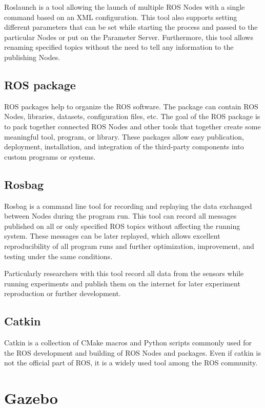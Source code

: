 Roslaunch is a tool allowing the launch of multiple ROS Nodes with a single command based on an XML configuration. This tool also supports setting different parameters that can be set while starting the process and passed to the particular Nodes or put on the Parameter Server. Furthermore, this tool allows renaming specified topics without the need to tell any information to the publishing Nodes.

\subsection*{ROS package}

ROS packages help to organize the ROS software. The package can contain ROS Nodes, libraries, datasets, configuration files, etc. The goal of the ROS package is to pack together connected ROS Nodes and other tools that together create some meaningful tool, program, or library. These packages allow easy publication, deployment, installation, and integration of the third-party components into custom programs or systems.

\subsection*{Rosbag}

Rosbag is a command line tool for recording and replaying the data exchanged between Nodes during the program run. This tool can record all messages published on all or only specified ROS topics without affecting the running system. These messages can be later replayed, which allows excellent reproducibility of all program runs and further optimization, improvement, and testing under the same conditions.\par
Particularly researchers with this tool record all data from the sensors while running experiments and publish them on the internet for later experiment reproduction or further development.

\subsection*{Catkin}

Catkin is a collection of CMake macros and Python scripts commonly used for the ROS development and building of ROS Nodes and packages. Even if catkin is not the official part of ROS, it is a widely used tool among the ROS community.

\section{Gazebo}

